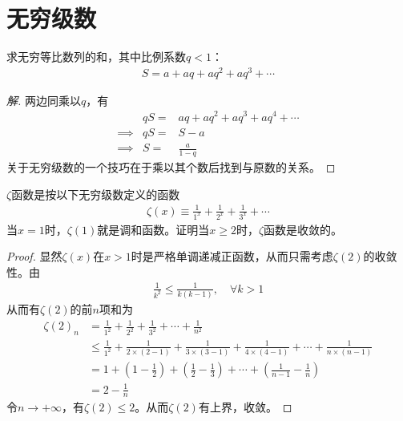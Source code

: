 
\chapter{无穷级数}
\label{chap:inifinite-series}

\begin{example}[等比数列]
  求无穷等比数列的和，其中比例系数$q<1$：
  \begin{align*}
    S=a + aq + aq^2 + aq^3 + \cdots
  \end{align*}
\end{example}
\begin{proof}[解]
  两边同乘以$q$，有
  \begin{eqnarray*}
            & qS=& aq + aq^2 + aq^3 + aq^4 + \cdots\\
    \implies& qS=& S - a\\
    \implies&  S=& \frac{a}{1-q}
  \end{eqnarray*}
  关于无穷级数的一个技巧在于乘以其个数后找到与原数的关系。
\end{proof}

\begin{example}[$\zeta$函数]
  $\zeta$函数是按以下无穷级数定义的函数
  \begin{align}
    \zeta(x)\equiv \frac1{1^x} + \frac1{2^x} + \frac1{3^x} + \cdots
  \end{align}
  当$x=1$时，$\zeta(1)$就是调和函数。证明当$x\ge2$时，$\zeta$函数是收敛的。
\end{example}
\begin{proof}
  显然$\zeta(x)$在$x>1$时是严格单调递减正函数，从而只需考虑$\zeta(2)$的收敛性。由
  \begin{align*}
    \frac1{k^2} \le \frac1{k(k-1)},\quad\forall k>1
  \end{align*}
  从而有$\zeta(2)$的前$n$项和为
  \begin{align*}
    \zeta(2)_n&=\frac1{1^2} + \frac1{2^2} + \frac1{3^2} + \cdots + \frac1{n^2}\\
            &\le \frac1{1^2} + \frac1{2\times(2-1)} + \frac1{3\times(3-1)} +\frac1{4\times(4-1)}+ \cdots + \frac1{n\times(n-1)}\\
            &= 1 + \left(1 - \frac12\right) + \left(\frac12 - \frac13\right) + \cdots + \left(\frac1{n-1}-\frac1n\right)\\
            &= 2 - \frac1n
  \end{align*}
  令$n\to+\infty$，有$\zeta(2)\le2$。从而$\zeta(2)$有上界，收敛。
\end{proof}

